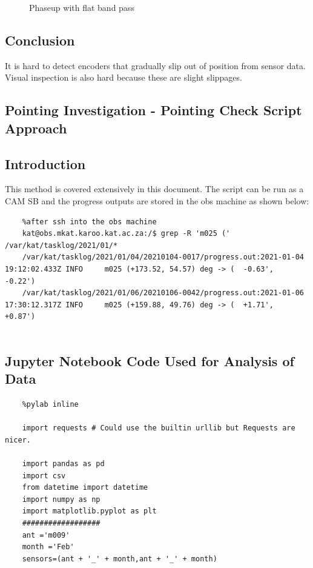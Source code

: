 \documentclass{article}
\begin{document}
{\begin{appendices}
\begin{figure}[H]
	\caption{Phaseup with flat band pass}
	\label{fig:m032_ok}
\end{figure}
\subsection{Conclusion}	
It is hard to detect encoders that gradually slip out of position from sensor data.  Visual inspection is also hard because these are slight slippages. 
\end{appendices}

\begin{appendices}
	\section{Pointing Investigation - Pointing Check Script Approach }\label{sec.py3}
	\subsection{Introduction}
	This method is covered extensively in this document. The script can be run as a CAM SB and the progress outputs are stored in the obs machine as shown below:
	\begin{lstlisting}
	%after ssh into the obs machine
	kat@obs.mkat.karoo.kat.ac.za:/$ grep -R 'm025 (' /var/kat/tasklog/2021/01/*
	/var/kat/tasklog/2021/01/04/20210104-0017/progress.out:2021-01-04 19:12:02.433Z INFO     m025 (+173.52, 54.57) deg -> (  -0.63',   -0.22')
	/var/kat/tasklog/2021/01/06/20210106-0042/progress.out:2021-01-06 17:30:12.317Z INFO     m025 (+159.88, 49.76) deg -> (  +1.71',   +0.87')
	
	\end{lstlisting}
	
\end{appendices}

\begin{appendices}
	\section{Jupyter Notebook Code Used for Analysis of Data  }\label{sec.py4}
	\begin{lstlisting}
	%pylab inline
	
	import requests # Could use the builtin urllib but Requests are nicer.
	
	import pandas as pd 
	import csv
	from datetime import datetime
	import numpy as np
	import matplotlib.pyplot as plt
    ##################	
	ant ='m009' 
	month ='Feb'
	sensors=(ant + '_' + month,ant + '_' + month)
	

\end{lstlisting}
\end{appendices}}
\end{document}
